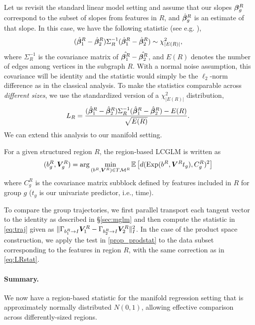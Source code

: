 Let us revisit the standard linear model setting and assume that 
our slopes $\bm{\beta}_g^R$ correspond to the subset of slopes from features in $R$, and $\hat{\bm{\beta}}_g^R$ is an estimate of that slope. In this case, we have the following  statistic (see e.g. \cite{seber2003linear}),
\begin{align}
(\hat{\bm{\beta}}_1^R - \hat{\bm{\beta}}_2^R)\Sigma_R^{-1}(\hat{\bm{\beta}}_1^R - \hat{\bm{\beta}}_2^R) \sim \chi_{|E(R)|}^2,
\end{align}
where $\Sigma_R^{-1}$ is the covariance matrix of $\hat{\bm{\beta}_1^R} - \hat{\bm{\beta}_2^R}$, and $E(R)$ denotes the number of edges among vertices in the subgraph $R$. With a normal noise assumption, this covariance will 
be identity and the statistic would simply be the $\ell_2$-norm difference as in the classical analysis. 
To make the statistics comparable across {\em different sizes}, we use the standardized version of a $\chi_{|E(R)|}^2$ distribution,
{\small\begin{align}\label{eq:LRstat}
L_R = \frac{(\hat{\bm{\beta}}_1^R - \hat{\bm{\beta}}_2^R)\Sigma_R^{-1}(\hat{\bm{\beta}}_1^R - \hat{\bm{\beta}}_2^R) - E(R) }{ \sqrt{E(R)} }.
\end{align}}
We can extend this analysis to our manifold setting.
\begin{definition}
For a given structured region $R$, the region-based LCGLM is written as
{ \begin{equation}
(b_g^R,\bm{V}_g^R) = \arg\min_{(b^R,\bm{V}^R) \in T\mathcal{M}^R} 
	\mathbb{E} \left[ d(\text{Exp}(b^R, \bm{V}^R t_g),C_g^R)^2\right]
\end{equation}}
where $C_g^R$ is the covariance matrix subblock defined by features included in $R$ for group $g$ ($t_g$ is our univariate predictor, i.e., time).
\end{definition}
To compare the group trajectories, we first parallel transport each tangent vector to the identity as described in \S\ref{sec:mglm} and then compute the statistic in \eqref{eq:traj} given as $\|\Gamma_{b_1^R \rightarrow I} \bm{V}_1^R - \Gamma_{b_2^R \rightarrow I} \bm{V}_2^R \|_{I}^2$.
In the case of the product space construction, we apply the test in \eqref{prop_prodstat} to the data subset corresponding to the features 
in region $R$, with the same correction as in \eqref{eq:LRstat}.

\paragraph{Summary.} We now have a region-based statistic for the manifold regression setting that is approximately normally distributed $N(0,1)$, allowing effective comparison across differently-sized regions.

